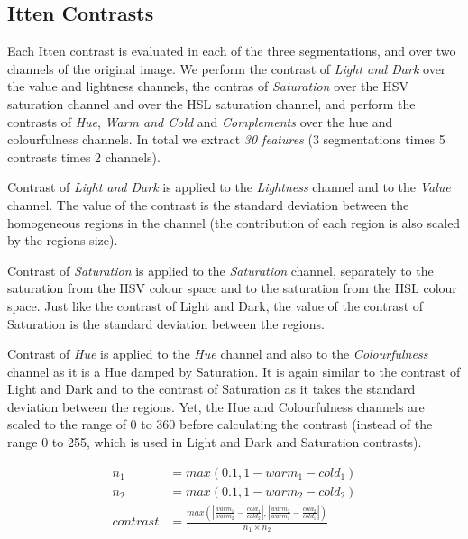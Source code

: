\documentclass[11pt,a4paper,twoside,openright]{report}
\begin{document}
\subsection{Itten Contrasts}

Each Itten contrast is evaluated in each of the three segmentations, and over
two channels of the original image.  We perform the contrast of \emph{Light and
Dark} over the value and lightness channels, the contras of \emph{Saturation}
over the HSV saturation channel and over the HSL saturation channel, and
perform the contrasts of \emph{Hue}, \emph{Warm and Cold} and
\emph{Complements} over the hue and colourfulness channels.  In total we
extract \emph{30 features} (3 segmentations times 5 contrasts times 2
channels).

Contrast of \emph{Light and Dark} is applied to the \emph{Lightness} channel
and to the \emph{Value} channel. The value of the contrast is the standard
deviation between the homogeneous regions in the channel (the contribution of
each region is also scaled by the regions size).

Contrast of \emph{Saturation} is applied to the \emph{Saturation} channel,
separately to the saturation from the HSV colour space and to the saturation
from the HSL colour space.  Just like the contrast of Light and Dark, the value
of the contrast of Saturation is the standard deviation between the regions.

Contrast of \emph{Hue} is applied to the \emph{Hue} channel and also to the
\emph{Colourfulness} channel as it is a Hue damped by Saturation.  It is again
similar to the contrast of Light and Dark and to the contrast of Saturation as
it takes the standard deviation between the regions.  Yet, the Hue and
Colourfulness channels are scaled to the range of 0 to 360 before calculating
the contrast (instead of the range 0 to 255, which is used in Light and Dark
and Saturation contrasts).

\begin{figure}[!htb]
\begin{equation}
\begin{aligned}
n_1       &= max(0.1, 1 - warm_1 - cold_1) \\
n_2       &= max(0.1, 1 - warm_2 - cold_2) \\
contrast  &= \frac{ max\left( \left\lvert \frac{warm_1}{warm_2}
                                        - \frac{cold_1}{cold_2} \right\rvert
                            , \left\lvert \frac{warm_2}{warm_1}
                                        - \frac{cold_2}{cold_1} \right\rvert
                       \right)
                 }{ n_1 \times n_2 }
\label{eq:coldwarm}
\end{aligned}
\end{equation}
\end{figure}
\end{document}

